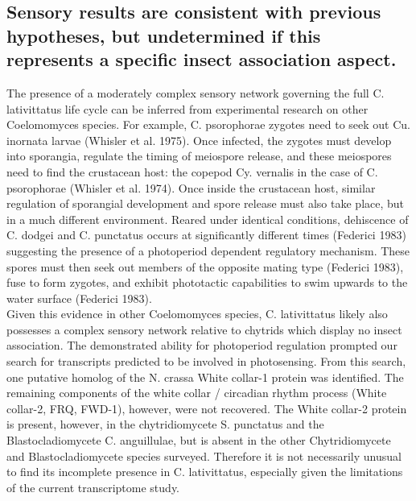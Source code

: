 \subsection{Sensory results are consistent with previous hypotheses, but undetermined if this represents a specific insect association aspect.}
The presence of a moderately complex sensory network governing the full C. lativittatus life cycle can be inferred from experimental research on other Coelomomyces species. For example, C. psorophorae zygotes need to seek out Cu. inornata larvae (Whisler et al. 1975). Once infected, the zygotes must develop into sporangia, regulate the timing of meiospore release, and these meiospores need to find the crustacean host: the copepod Cy. vernalis in the case of C. psorophorae (Whisler et al. 1974). Once inside the crustacean host, similar regulation of sporangial development and spore release must also take place, but in a much different environment. Reared under identical conditions, dehiscence of C. dodgei and C. punctatus occurs at significantly different times (Federici 1983) suggesting the presence of a photoperiod dependent regulatory mechanism. These spores must then seek out members of the opposite mating type (Federici 1983), fuse to form zygotes, and exhibit phototactic capabilities to swim upwards to the water surface (Federici 1983). \\
\indent Given this evidence in other Coelomomyces species, C. lativittatus likely also possesses a complex sensory network relative to chytrids which display no insect association. The demonstrated ability for photoperiod regulation prompted our search for transcripts predicted to be involved in photosensing. From this search, one putative homolog of the N. crassa White collar-1 protein was identified. The remaining components of the white collar / circadian rhythm process (White collar-2, FRQ, FWD-1), however, were not recovered. The White collar-2 protein is present, however, in the chytridiomycete S. punctatus and the Blastocladiomycete C. anguillulae, but is absent in the other Chytridiomycete and Blastocladiomycete species surveyed. Therefore it is not necessarily unusual to find its incomplete presence in C. lativittatus, especially given the limitations of the current transcriptome study. \\
